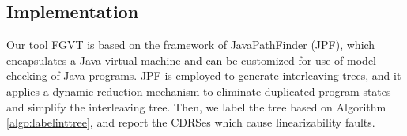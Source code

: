 \documentclass[runningheads]{llncs}
\begin{document}
\vspace{-0.3cm}
\subsection{Implementation}
Our tool FGVT is based on the framework of JavaPathFinder (JPF), which encapsulates a Java virtual machine and can be customized for use of model checking of Java programs. JPF is employed to generate interleaving trees, and it applies a dynamic reduction mechanism to eliminate duplicated program states and simplify the interleaving tree. Then, we label the tree based on Algorithm \ref{algo:labelinttree}, and report the CDRSes which cause linearizability faults. %





\end{document}

